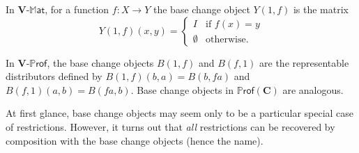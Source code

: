 \documentclass{tac}
\newcommand{\mb}[1]{{\mathbf{#1}}}
\newcommand{\maps}{\colon}
\newcommand{\MAT}[1]{\mathbf{#1}\mbox{-}\mathbb{M}\mathsf{at}}
\newcommand{\PROF}[1]{\mathbf{#1}\mbox{-}\mathbb{P}\mathsf{rof}}
\newcommand{\iPROF}[1]{\mathbb{P}\mathsf{rof}(\mb{#1})}
\numberwithin{equation}{section}
\begin{document}
\begin{example}
  In $\MAT{V}$, for a function $f\maps X\to Y$  the base change object
  $Y(1,f)$ is the matrix
  \[Y(1,f)(x,y) =
  \begin{cases}
    I & \text{if } f(x)=y \\
    \emptyset & \text{otherwise}.
  \end{cases}
  \]
\end{example}

\begin{example}
  In $\PROF{V}$, the base change objects $B(1,f)$ and $B(f,1)$ are the
  representable distributors defined by $B(1,f)(b,a) = B(b,fa)$ and $B(f,1)(a,b) =
  B(fa,b)$.  Base change objects in $\iPROF{C}$ are analogous.
\end{example}

At first glance, base change objects may seem only to be a particular
special case of restrictions.  However, it turns out that \emph{all}
restrictions can be recovered by composition with the base change
objects (hence the name).
\end{document}
